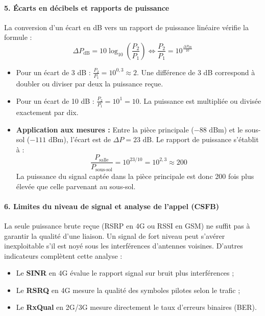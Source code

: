 \documentclass[11pt,a4paper]{article}
\begin{document}
\paragraph{5. \'Ecarts en d\'ecibels et rapports de puissance}
La conversion d'un \'ecart en dB vers un rapport de puissance lin\'eaire v\'erifie la formule :
\begin{equation}
    \Delta P_{\text{dB}} = 10 \log_{10}\left(\frac{P_2}{P_1}\right) \iff \frac{P_2}{P_1} = 10^{\frac{\Delta P_{\text{dB}}}{10}}
\end{equation}
\begin{itemize}
    \item Pour un \'ecart de 3 dB : $\frac{P_2}{P_1} = 10^{0{,}3} \approx 2$. Une diff\'erence de 3 dB correspond \`a doubler ou diviser par deux la puissance re\c{c}ue.
    \item Pour un \'ecart de 10 dB : $\frac{P_2}{P_1} = 10^1 = 10$. La puissance est multipli\'ee ou divis\'ee exactement par dix.
    \item \textbf{Application aux mesures :} Entre la pi\`ece principale ($-88\text{ dBm}$) et le sous-sol ($-111\text{ dBm}$), l'\'ecart est de $\Delta P = 23\text{ dB}$. Le rapport de puissance s'\'etablit \`a :
    \begin{equation}
        \frac{P_{\text{salle}}}{P_{\text{sous-sol}}} = 10^{23/10} = 10^{2{,}3} \approx 200
    \end{equation}
    La puissance du signal capt\'ee dans la pi\`ece principale est donc 200 fois plus \'elev\'ee que celle parvenant au sous-sol.
\end{itemize}

\paragraph{6. Limites du niveau de signal et analyse de l'appel (CSFB)}
La seule puissance brute re\c{c}ue (RSRP en 4G ou RSSI en GSM) ne suffit pas \`a garantir la qualit\'e d'une liaison. Un signal de fort niveau peut s'av\'erer inexploitable s'il est noy\'e sous les interf\'erences d'antennes voisines. D'autres indicateurs compl\`etent cette analyse :
\begin{itemize}
    \item Le \textbf{SINR} en 4G \'evalue le rapport signal sur bruit plus interf\'erences ;
    \item Le \textbf{RSRQ} en 4G mesure la qualit\'e des symboles pilotes selon le trafic ;
    \item Le \textbf{RxQual} en 2G/3G mesure directement le taux d'erreurs binaires (BER).
\end{itemize}
\end{document}
